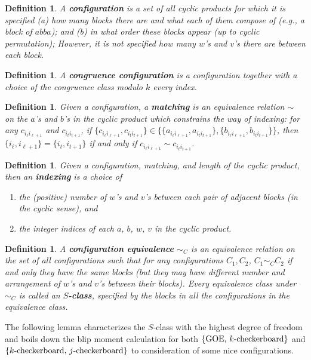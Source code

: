 \documentclass[11pt,reqno]{amsart}
\numberwithin{equation}{section}
\newtheorem{defi}[thm]{Definition}
\theoremstyle{plain}
\begin{document}
\begin{defi}
A \textbf{configuration} is a set of all cyclic products for which it is specified (a) how many blocks there are and what each of them compose of (e.g., a block of $abba$); and (b) in what order these blocks appear (up to cyclic permutation); However, it is not specified how many $w$'s and $v$'s there are between each block.
\end{defi}

\begin{defi}
A \textbf{congruence configuration} is a configuration together with a choice of the congruence class modulo $k$ every index.
\end{defi}

\begin{defi}
Given a configuration, a \textbf{matching} is an equivalence relation $\sim$ on the $a$'s and $b$'s in the cyclic product which constrains the way of indexing: for any $c_{i_\ell i_{\ell+1}}$ and $c_{i_ti_{t+1}}$, if $\{c_{i_\ell i_{\ell+1}}, c_{i_ti_{t+1}}\}\in \{\{a_{i_\ell i_{\ell+1}},a_{i_ti_{t+1}}\}, \{b_{i_\ell i_{\ell+1}}, b_{i_t i_{t+1}}\}\}$, then $\{i_\ell, i_{\ell+1}\}=\{i_t, i_{t+1}\}$ if and only if $c_{i_\ell i_{\ell+1}}\sim c_{i_ti_{t+1}}$.
\end{defi}

\begin{defi}
Given a configuration, matching, and length of the cyclic product, then an \textbf{indexing} is a choice of
\begin{enumerate}
\item the (positive) number of $w$'s and $v$'s between each pair of adjacent blocks (in the cyclic sense), and
\item the integer indices of each $a$, $b$, $w$, $v$ in the cyclic product.
\end{enumerate}
\end{defi}

\begin{defi}
A \textbf{configuration equivalence} $\sim_C$ is an equivalence relation on the set of all configurations such that for any configurations $C_1, C_2$, $C_1\sim_C C_2$ if and only they have the same blocks (but they may have different number and arrangement of $w$'s and $v$'s between their blocks). Every equivalence class under $\sim_C$ is called an \textbf{$S$-class}, specified by the blocks in all the configurations in the equivalence class. 
\end{defi}

The following lemma characterizes the $S$-class with the highest degree of freedom and boils down the blip moment calculation for both $\{\textup{GOE, }k\textup{-checkerboard}\}$ and $\{k\textup{-checkerboard, }j\textup{-checkerboard}\}$ to consideration of some nice configurations.
\end{document}
